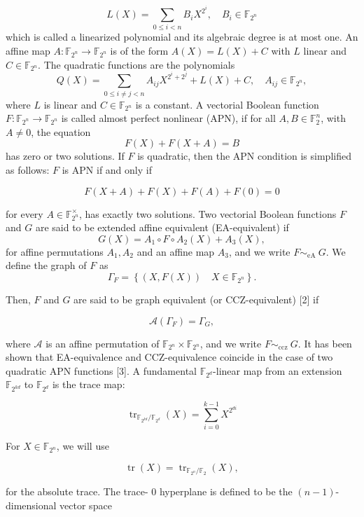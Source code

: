 \documentclass[10pt]{article}
\begin{document}
$$
L(X)=\sum_{0 \leq i<n} B_{i} X^{2^{i}}, \quad B_{i} \in \mathbb{F}_{2^{n}}
$$
which is called a linearized polynomial and its algebraic degree is at most one. An affine map $A: \mathbb{F}_{2^{n}} \rightarrow \mathbb{F}_{2^{n}}$ is of the form $A(X)=L(X)+C$ with $L$ linear and $C \in \mathbb{F}_{2^{n}}$. The quadratic functions are the polynomials
$$
Q(X)=\sum_{0 \leq i \neq j<n} A_{i j} X^{2^{i}+2^{j}}+L(X)+C, \quad A_{i j} \in \mathbb{F}_{2^{n}},
$$
where $L$ is linear and $C \in \mathbb{F}_{2^{n}}$ is a constant. A vectorial Boolean function $F: \mathbb{F}_{2^{n}} \rightarrow \mathbb{F}_{2^{n}}$ is called almost perfect nonlinear (APN), if for all $A, B \in \mathbb{F}_{2}^{n}$, with $A \neq 0$, the equation
$$
F(X)+F(X+A)=B
$$
has zero or two solutions. If $F$ is quadratic, then the APN condition is simplified as follows: $F$ is APN if and only if

\begin{equation*}
F(X+A)+F(X)+F(A)+F(0)=0 \tag{1}
\end{equation*}

for every $A \in \mathbb{F}_{2^{n}}^{\times}$, has exactly two solutions. Two vectorial Boolean functions $F$ and $G$ are said to be extended affine equivalent (EA-equivalent) if
$$
G(X)=A_{1} \circ F \circ A_{2}(X)+A_{3}(X),
$$
for affine permutations $A_{1}, A_{2}$ and an affine map $A_{3}$, and we write $F \sim_{\text {eA }} G$. We define the graph of $F$ as
$$
\Gamma_{F}=\left\{(X, F(X)) \quad X \in \mathbb{F}_{2^{n}}\right\} .
$$

Then, $F$ and $G$ are said to be graph equivalent (or CCZ-equivalent) [2] if

$$
\mathcal{A}\left(\Gamma_{F}\right)=\Gamma_{G},
$$

where $\mathcal{A}$ is an affine permutation of $\mathbb{F}_{2^{n}} \times \mathbb{F}_{2^{n}}$, and we write $F \sim_{\text {ccz }} G$. It has been shown that EA-equivalence and CCZ-equivalence coincide in the case of two quadratic APN functions [3]. A fundamental $\mathbb{F}_{2^{d}}$-linear map from an extension $\mathbb{F}_{2^{k d}}$ to $\mathbb{F}_{2^{d}}$ is the trace map:

$$
\operatorname{tr}_{\mathbb{F}_{2^{k d}} / \mathbb{F}_{2^{d}}}(X)=\sum_{i=0}^{k-1} X^{2^{d i}}
$$

For $X \in \mathbb{F}_{2^{n}}$, we will use

$$
\operatorname{tr}(X)=\operatorname{tr}_{\mathbb{F}_{2^{n}} / \mathbb{F}_{2}}(X),
$$

for the absolute trace. The trace- 0 hyperplane is defined to be the $(n-1)$-dimensional vector space
\end{document}
